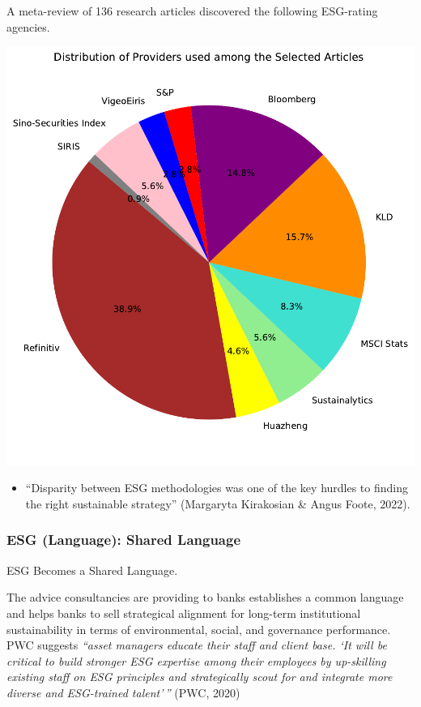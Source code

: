 \documentclass[
  letterpaper,
  DIV=11,
  numbers=noendperiod]{scrartcl}
\providecommand{\tightlist}{%
  \setlength{\itemsep}{0pt}\setlength{\parskip}{0pt}}\usepackage{longtable,booktabs,array}
\begin{document}
A meta-review of 136 research articles discovered the following
ESG-rating agencies.

\includegraphics{_thesis_files/figure-pdf/cell-61-output-1.pdf}

\begin{itemize}
\tightlist
\item
  ``Disparity between ESG methodologies was one of the key hurdles to
  finding the right sustainable strategy'' (Margaryta Kirakosian \&
  Angus Foote, 2022).
\end{itemize}

\subsubsection{ESG (Language): Shared
Language}\label{esg-language-shared-language}

ESG Becomes a Shared Language.

The advice consultancies are providing to banks establishes a common
language and helps banks to sell strategical alignment for long-term
institutional sustainability in terms of environmental, social, and
governance performance. PWC suggests \emph{``asset managers educate
their staff and client base. `It will be critical to build stronger ESG
expertise among their employees by up-skilling existing staff on ESG
principles and strategically scout for and integrate more diverse and
ESG-trained talent'\,''} (PWC, 2020)
\end{document}
